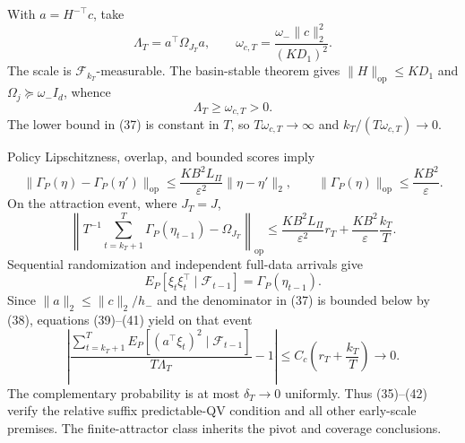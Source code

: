 With \(a=H^{-\top}c\), take
\[
 \Lambda_T=a^\top\Omega_{J_T}a,\qquad
 \omega_{c,T}=\frac{\omega_-\|c\|_2^2}{(KD_1)^2}.
\tag{37}
\]
The scale is \(\mathcal F_{k_T}\)-measurable.  The basin-stable theorem gives \(\|H\|_{\mathrm{op}}\le KD_1\) and \(\Omega_j\succeq\omega_-I_d\), whence
\[
 \Lambda_T\ge\omega_{c,T}>0.
\tag{38}
\]
The lower bound in (37) is constant in \(T\), so \(T\omega_{c,T}\to\infty\) and \(k_T/(T\omega_{c,T})\to0\).

Policy Lipschitzness, overlap, and bounded scores imply
\[
 \|\Gamma_P(\eta)-\Gamma_P(\eta')\|_{\mathrm{op}}
 \le\frac{KB^2L_\Pi}{\varepsilon^2}\|\eta-\eta'\|_2,
 \qquad \|\Gamma_P(\eta)\|_{\mathrm{op}}\le\frac{KB^2}{\varepsilon}.
\tag{39}
\]
On the attraction event, where \(J_T=J\),
\[
 \left\|T^{-1}\sum_{t=k_T+1}^T\Gamma_P(\eta_{t-1})-
 \Omega_{J_T}\right\|_{\mathrm{op}}
 \le\frac{KB^2L_\Pi}{\varepsilon^2}r_T
 +\frac{KB^2}{\varepsilon}\frac{k_T}{T}.
\tag{40}
\]
Sequential randomization and independent full-data arrivals give
\[
 E_P[\xi_t\xi_t^\top\mid\mathcal F_{t-1}]
 =\Gamma_P(\eta_{t-1}).
\tag{41}
\]
Since \(\|a\|_2\le\|c\|_2/h_-\) and the denominator in (37) is bounded below by (38), equations (39)--(41) yield on that event
\[
 \left|
 \frac{\sum_{t=k_T+1}^TE_P[(a^\top\xi_t)^2\mid\mathcal F_{t-1}]}
 {T\Lambda_T}-1\right|
 \le C_c\left(r_T+\frac{k_T}{T}\right)\longrightarrow0.
\tag{42}
\]
The complementary probability is at most \(\delta_T\to0\) uniformly.  Thus (35)--(42) verify the relative suffix predictable-QV condition and all other early-scale premises.  The finite-attractor class inherits the pivot and coverage conclusions.
